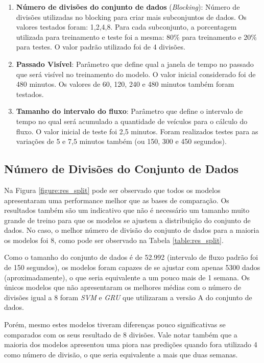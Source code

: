 \begin{enumerate}
	\item \textbf{Número de divisões do conjunto de dados} (\textit{Blocking}): Número de divisões utilizadas no blocking para criar mais subconjuntos de dados. Os valores testados foram: 1,2,4,8. Para cada subconjunto, a porcentagem utilizada para treinamento e teste foi a mesma: 80\% para treinamento e 20\% para testes. O valor padrão utilizado foi de 4 divisões.
	\item \textbf{Passado Visível}: Parâmetro que define qual a janela de tempo no passado que será visível no treinamento do modelo. O valor inicial considerado foi de 480 minutos. Os valores de 60, 120, 240 e 480 minutos também foram testados.
	\item \textbf{Tamanho do intervalo do fluxo}: Parâmetro que define o intervalo de tempo no qual será acumulado a quantidade de veículos para o cálculo do fluxo. O valor inicial de teste foi 2,5 minutos. Foram realizados testes para as variações de 5 e 7,5 minutos também (ou 150, 300 e 450 segundos).
\end{enumerate}

\subsection{Número de Divisões do Conjunto de Dados}

Na Figura \ref{figure:res_split} pode ser observado que todos os modelos apresentaram uma performance melhor que as bases de comparação. Os resultados também são um indicativo que não é necessário um tamanho muito grande de treino para que os modelos se ajustem a distribuição do conjunto de dados. No caso, o melhor número de divisão do conjunto de dados para a maioria os modelos foi  8, como pode ser observado na Tabela \ref{table:res_split}. 

Como o tamanho do conjunto de dados é de 52.992 (intervalo de fluxo padrão foi de 150 segundos), os modelos foram capazes de se ajustar com apenas 5300 dados (aproximadamente), o que seria equivalente a um pouco mais de 1 semana. Os únicos modelos que não apresentaram os melhores médias com o número de divisões igual a 8 foram \textit{\acrshort{SVM}} e \textit{\acrshort{GRU}} que utilizaram a versão A do conjunto de dados. 

Porém, mesmo estes modelos tiveram diferenças pouco significativas se comparados com os seus resultado de 8 divisões. Vale notar também que a maioria dos modelos apresentou uma piora nas predições quando fora utilizado 4 como número de divisão, o que seria equivalente a mais que duas semanas.


